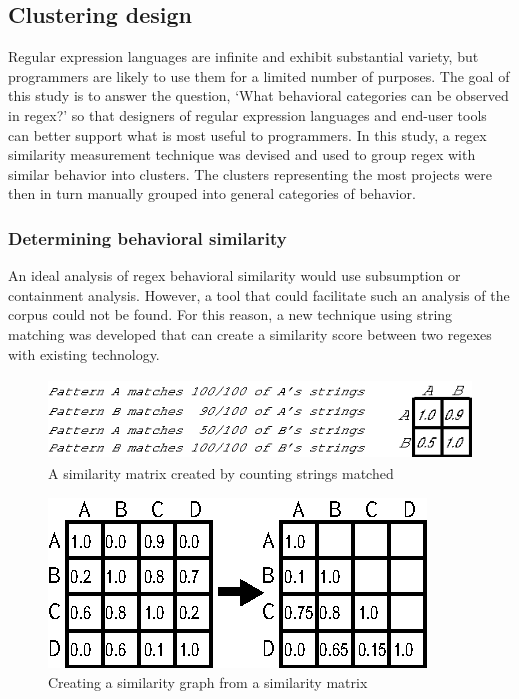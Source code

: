 \subsection{Clustering design}
\label{sec:clusteringDesign}

Regular expression languages are infinite and exhibit substantial variety, but programmers are likely to use them for a limited number of purposes.  The goal of this study is to answer the question, `What behavioral categories can be observed in regex?' so that designers of regular expression languages and end-user tools can better support what is most useful to programmers.  In this study, a regex similarity measurement technique was devised and used to group regex with similar behavior into clusters.  The clusters representing the most projects were then in turn manually grouped into general categories of behavior.

\subsubsection{Determining behavioral similarity}
An ideal analysis of regex behavioral similarity would use subsumption or containment analysis. However, a tool that could facilitate such an analysis of the corpus could not be found.  For this reason, a new technique using string matching was developed that can create a similarity score between two regexes with existing technology.

\begin{figure}[tb]
\centering
\includegraphics[height=0.85in]{nontex/illustrations/minimalMatrix.eps}
\caption{A similarity matrix created by counting strings matched}
\label{fig:minimalMatrix}
\end{figure}

\begin{figure}[tb]
\centering
\includegraphics[width=0.5\columnwidth]{nontex/illustrations/matrixToGraph.eps}
\vspace{-6pt}
\caption{Creating a similarity graph from a similarity matrix}
\vspace{-6pt}
\label{fig:matrixToGraph}
\end{figure}



